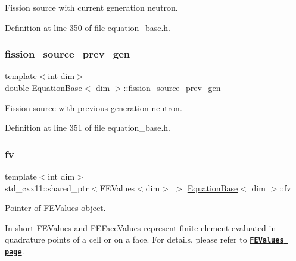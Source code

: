 Fission source with current generation neutron. 



Definition at line 350 of file equation\+\_\+base.\+h.

\mbox{\label{class_equation_base_aac7587c6cd96b508a52f1ed4782b4806}} 
\subsubsection{\texorpdfstring{fission\+\_\+source\+\_\+prev\+\_\+gen}{fission\_source\_prev\_gen}}
{\footnotesize\ttfamily template$<$int dim$>$ \\
double \hyperlink{class_equation_base}{Equation\+Base}$<$ dim $>$\+::fission\+\_\+source\+\_\+prev\+\_\+gen\hspace{0.3cm}{\ttfamily [protected]}}



Fission source with previous generation neutron. 



Definition at line 351 of file equation\+\_\+base.\+h.

\mbox{\label{class_equation_base_abf3c19880eaea0911fff9eb7f3b4b425}} 
\subsubsection{\texorpdfstring{fv}{fv}}
{\footnotesize\ttfamily template$<$int dim$>$ \\
std\+\_\+cxx11\+::shared\+\_\+ptr$<$F\+E\+Values$<$dim$>$ $>$ \hyperlink{class_equation_base}{Equation\+Base}$<$ dim $>$\+::fv\hspace{0.3cm}{\ttfamily [protected]}}



Pointer of F\+E\+Values object. 

In short F\+E\+Values and F\+E\+Face\+Values represent finite element evaluated in quadrature points of a cell or on a face. For details, please refer to \href{https://www.dealii.org/8.5.0/doxygen/deal.II/classFEValuesBase.html}{\tt {\bfseries F\+E\+Values page}}. 

